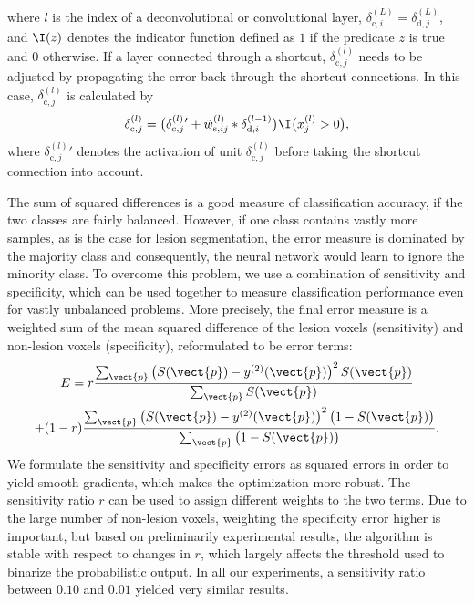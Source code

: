 where $l$ is the index of a deconvolutional or convolutional layer,
$\delta^{(L)}_{\text{c},i} = \delta^{(L)}_{\text{d},j}$, and $\I(z)$ denotes the
indicator function defined as $1$ if the predicate $z$ is true and $0$
otherwise. If a layer connected through a shortcut,
$\delta^{(l)}_{\text{c},j}$ needs to be adjusted by propagating the error back
through the shortcut connections. In this case, $\delta^{(l)}_{\text{c},j}$ is
calculated by
\begin{equation}
\delta^{(l)}_{\text{c},j} =
\big(\delta^{(l)}_{\text{c},j}{}'+
\tilde{w}^{(l)}_{\text{s},ij}*\delta^{(l-1)}_{\text{d},i}\big)\I\big(x^{(l)}_j
> 0\big),
\label{eq:deltas}
\end{equation}
where $\delta^{(l)}_{\text{c},j}{}'$ denotes the activation of unit
$\delta^{(l)}_{\text{c},j}$ before taking the shortcut connection into account.


The sum of squared differences is a good measure of classification accuracy, if
the two classes are fairly balanced. However, if one class contains vastly more
samples, as is the case for lesion segmentation, the error measure is dominated
by the majority class and consequently, the neural network would learn to ignore
the minority class. To overcome this problem, we use a combination of
sensitivity and specificity, which can be used together to measure
classification performance even for vastly unbalanced problems. More precisely,
the final error measure is a weighted sum of the mean squared difference of the
lesion voxels (sensitivity) and non-lesion voxels (specificity), reformulated to
be error terms:
\begin{multline} 
E = r\frac{\textstyle\sum_{\vect{p}} \left(S(\vect{p}) -
y^{(2)}(\vect{p})\right)^2 S(\vect{p})}{\textstyle\sum_{\vect{p}} S(\vect{p})}
\\
 + (1-r)\frac{\textstyle\sum_{\vect{p}} \left(S(\vect{p}) -
y^{(2)}(\vect{p})\right)^2 \big(1 - S(\vect{p})\big)}{%
\textstyle\sum_{\vect{p}}\big(1 - S(\vect{p})\big)}.
\end{multline}
We formulate the sensitivity and specificity errors as squared errors in order
to yield smooth gradients, which makes the optimization more robust. The
sensitivity ratio $r$ can be used to assign different weights to the two terms.
Due to the large number of non-lesion voxels, weighting the specificity error
higher is important, but based on preliminarily experimental results, the
algorithm is stable with respect to changes in $r$, which largely affects the
threshold used to binarize the probabilistic output. In all our experiments, a
sensitivity ratio between $0.10$ and $0.01$ yielded very similar results.

